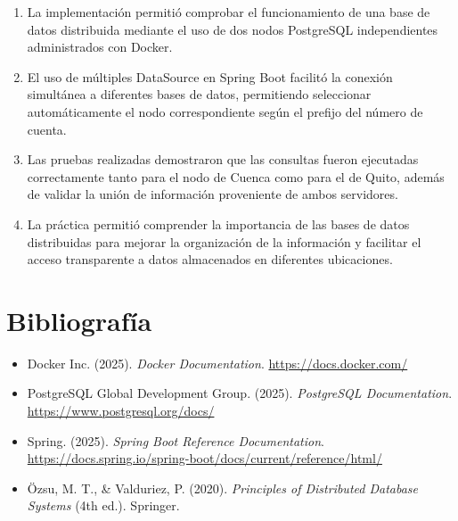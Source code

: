 \documentclass[11pt,a4paper]{article}
\begin{document}
\begin{enumerate}[leftmargin=*]
    \item La implementación permitió comprobar el funcionamiento de una base de datos distribuida mediante el uso de dos nodos PostgreSQL independientes administrados con Docker.
    \item El uso de múltiples DataSource en Spring Boot facilitó la conexión simultánea a diferentes bases de datos, permitiendo seleccionar automáticamente el nodo correspondiente según el prefijo del número de cuenta.
    \item Las pruebas realizadas demostraron que las consultas fueron ejecutadas correctamente tanto para el nodo de Cuenca como para el de Quito, además de validar la unión de información proveniente de ambos servidores.
    \item La práctica permitió comprender la importancia de las bases de datos distribuidas para mejorar la organización de la información y facilitar el acceso transparente a datos almacenados en diferentes ubicaciones.
\end{enumerate}

\FloatBarrier
\section{Bibliografía}

\begin{itemize}[leftmargin=*]
    \item Docker Inc. (2025). \textit{Docker Documentation}. \url{https://docs.docker.com/}
    \item PostgreSQL Global Development Group. (2025). \textit{PostgreSQL Documentation}. \url{https://www.postgresql.org/docs/}
    \item Spring. (2025). \textit{Spring Boot Reference Documentation}. \url{https://docs.spring.io/spring-boot/docs/current/reference/html/}
    \item Özsu, M. T., \& Valduriez, P. (2020). \textit{Principles of Distributed Database Systems} (4th ed.). Springer.
\end{itemize}
\end{document}
